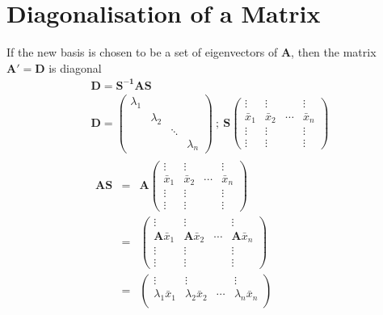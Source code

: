 \documentclass[a4paper, 11pt, normalem]{report}
\begin{document}
\section{Diagonalisation of a Matrix}
If the new basis is chosen to be a set of eigenvectors of $\mathbf{A}$, then the matrix $\mathbf{A}' = \mathbf{D}$ is diagonal
\begin{gather*}
    \mathbf{D} = \mathbf{S^{-1}AS} \\
    \mathbf{D} =
    \begin{pmatrix}
        \lambda_1 & & & \\
        & \lambda_2 & & \\
        & & \ddots &    \\
        & & & \lambda_n
    \end{pmatrix} ~;~ \mathbf{S}
    \begin{pmatrix}
        \vdots & \vdots & & \vdots \\
        \bar{x}_1 & \bar{x}_2 & \cdots & \bar{x}_n \\
        \vdots & \vdots & & \vdots \\
        \vdots & \vdots & & \vdots
    \end{pmatrix} \\
    \begin{aligned}
        \mathbf{AS} &=& \mathbf{A}
        \begin{pmatrix}
            \vdots & \vdots & & \vdots \\
            \bar{x}_1 & \bar{x}_2 & \cdots & \bar{x}_n \\
            \vdots & \vdots & & \vdots \\
            \vdots & \vdots & & \vdots
        \end{pmatrix} \\ &=&
        \begin{pmatrix}
            \vdots & \vdots & & \vdots \\
            \mathbf{A}\bar{x}_1 & \mathbf{A}\bar{x}_2 & \cdots & \mathbf{A}\bar{x}_n \\
            \vdots & \vdots & & \vdots \\
            \vdots & \vdots & & \vdots
        \end{pmatrix} \\ &=&
        \begin{pmatrix}
            \vdots & \vdots & & \vdots \\
            \lambda_{1}\bar{x}_1 & \lambda_{2}\bar{x}_2 & \cdots & \lambda_{n}\bar{x}_n \\

\end{pmatrix}
\end{aligned}
\end{gather*}
\end{document}
